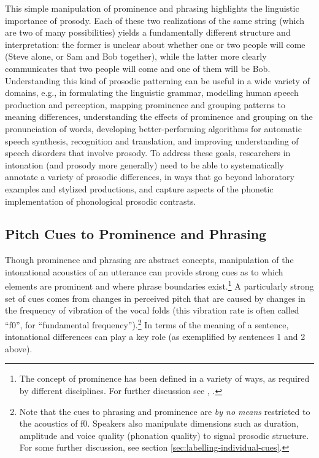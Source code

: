 \documentclass[11pt, twoside]{memoir}
\begin{document}
This simple manipulation of prominence and phrasing highlights the linguistic importance of prosody. Each of these two realizations of the same string (which are two of many possibilities) yields a fundamentally different structure and interpretation: the former is unclear about whether one or two people will come (Steve alone, or Sam and Bob together), while the latter more clearly communicates that two people will come and one of them will be Bob. Understanding this kind of prosodic patterning can be useful in a wide variety of domains, e.g., in formulating the linguistic grammar, modelling human speech production and perception, mapping prominence and grouping patterns to meaning differences, understanding the effects of prominence and grouping on the pronunciation of words, developing better-performing algorithms for automatic speech synthesis, recognition and translation, and improving understanding of speech disorders that involve prosody. To address these goals, researchers in intonation (and prosody more generally) need to be able to systematically annotate a variety of prosodic differences, in ways that go beyond laboratory examples and stylized productions, and capture aspects of the phonetic implementation of phonological prosodic contrasts.

\subsection{Pitch Cues to Prominence and Phrasing}\label{sec:pitch-cues-to-prominence-and-phrasing}

Though prominence and phrasing are abstract concepts, manipulation of the intonational acoustics of an utterance can provide strong cues as to which elements are prominent and where phrase boundaries exist.\footnote{The concept of prominence has been defined in a variety of ways, as required by different disciplines. For further discussion see \citealt{gussenhoven15}, \citealt{wagner-15}.} A particularly strong set of cues comes from changes in perceived pitch that are caused by changes in the frequency of vibration of the vocal folds (this vibration rate is often called “f0”, for “fundamental frequency”).\footnote{Note that the cues to phrasing and prominence are \textit{by no means} restricted to the acoustics of f0.  Speakers also manipulate dimensions such as duration, amplitude and voice quality (phonation quality) to signal prosodic structure. For some further discussion, see section \ref{sec:labelling-individual-cues}.} In terms of the meaning of a sentence, intonational differences can play a key role (as exemplified by sentences 1 and 2 above).
\end{document}
